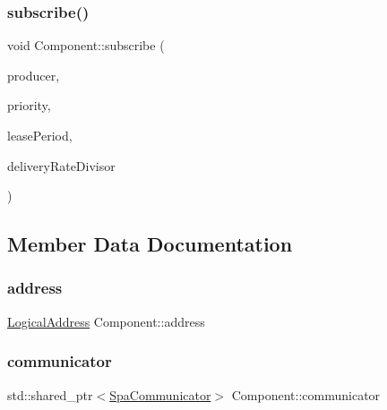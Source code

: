 \mbox{\label{classComponent_abae1852e26a7bee748898ea8ef6f4fb9}} 
\subsubsection{\texorpdfstring{subscribe()}{subscribe()}\hspace{0.1cm}{\footnotesize\ttfamily [2/2]}}
{\footnotesize\ttfamily void Component\+::subscribe (\begin{DoxyParamCaption}\item[{\hyperlink{structLogicalAddress}{Logical\+Address}}]{producer,  }\item[{uint8\+\_\+t}]{priority,  }\item[{uint32\+\_\+t}]{lease\+Period,  }\item[{uint16\+\_\+t}]{delivery\+Rate\+Divisor }\end{DoxyParamCaption})}



\subsection{Member Data Documentation}
\mbox{\label{classComponent_aa60ef4220c2630dde612e2f0164b3676}} 
\subsubsection{\texorpdfstring{address}{address}}
{\footnotesize\ttfamily \hyperlink{structLogicalAddress}{Logical\+Address} Component\+::address\hspace{0.3cm}{\ttfamily [protected]}}

\mbox{\label{classComponent_ab124decba1547f96b7df055e3b7e902e}} 
\subsubsection{\texorpdfstring{communicator}{communicator}}
{\footnotesize\ttfamily std\+::shared\+\_\+ptr$<$\hyperlink{classSpaCommunicator}{Spa\+Communicator}$>$ Component\+::communicator}

